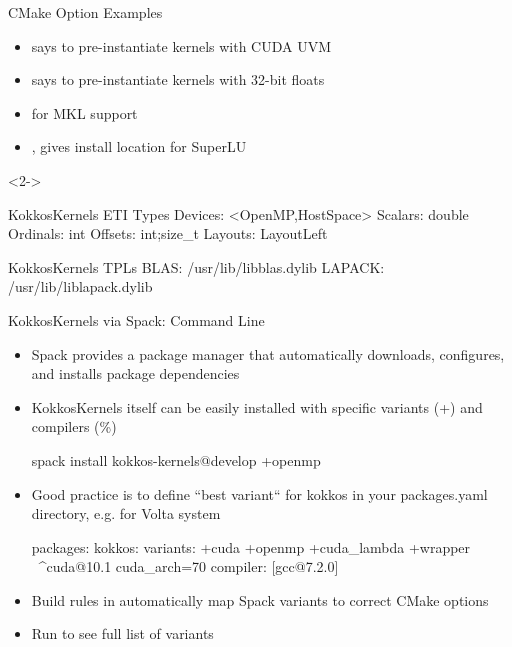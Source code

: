 \begin{frame}[fragile]{CMake Option Examples}
\begin{itemize}
\item {} says to pre-instantiate kernels with CUDA UVM
\item {} says to pre-instantiate kernels with 32-bit floats
\item {} for MKL support
\item {},   gives install location for SuperLU
\end{itemize}

\begin{uncoverenv}<2->
\begin{shell}
KokkosKernels ETI Types
   Devices:  <OpenMP,HostSpace>
   Scalars:  double
   Ordinals: int
   Offsets:  int;size_t
   Layouts:  LayoutLeft

KokkosKernels TPLs
   BLAS:        /usr/lib/libblas.dylib
   LAPACK:      /usr/lib/liblapack.dylib
\end{shell}
\end{uncoverenv}
\end{frame}




\begin{frame}[fragile]{KokkosKernels via Spack: Command Line}
\begin{itemize}
\item Spack provides a package manager that automatically downloads, configures, and installs package dependencies
\item KokkosKernels itself can be easily installed with specific variants (+) and compilers (\%)
\begin{shell}
spack install kokkos-kernels@develop +openmp %
\end{shell}
\item Good practice is to define ``best variant`` for kokkos in your packages.yaml directory, e.g. for Volta system
\begin{shell}
packages:
   kokkos:
    variants: +cuda +openmp +cuda_lambda +wrapper \
              ^cuda@10.1 cuda_arch=70
    compiler: [gcc@7.2.0]
\end{shell}
\item Build rules in  automatically map Spack variants to correct CMake options
\item Run \inlineshell{spack info kokkos-kernels} to see full list of variants
\end{itemize}
\end{frame}

